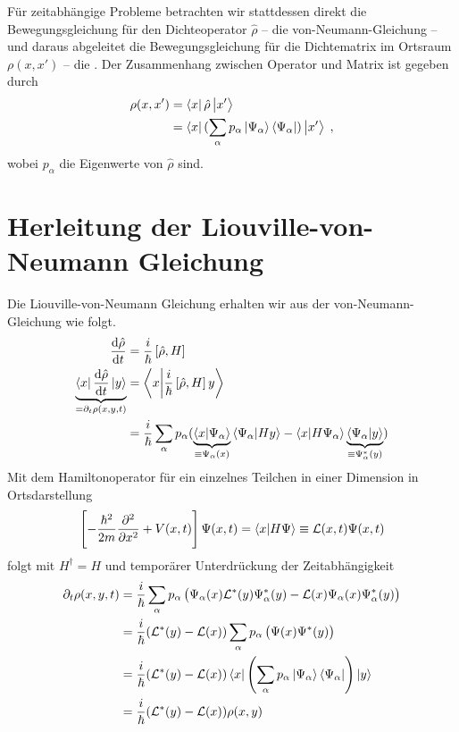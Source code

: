 Für zeitabhängige Probleme betrachten wir stattdessen direkt die Bewegungsgleichung für den Dichteoperator $\hat{\rho}$ -- die von-Neumann-Gleichung -- und daraus abgeleitet die Bewegungsgleichung für die Dichtematrix im Ortsraum $\rho(x,x')$ -- die \lvn. Der Zusammenhang zwischen Operator und Matrix ist gegeben durch
\begin{align}
  \rho(x,x') &= \bra{x} \hat{\rho} \ket{x'} \\
  &= \bra{x} (\sum_{\alpha} p_{\alpha} \ket{\Psi_{\alpha}}\bra{\Psi_{\alpha}}) \ket{x'} \; ,
\end{align}
wobei $p_{\alpha}$ die Eigenwerte von $\hat{\rho}$ sind.

\section{Herleitung der Liouville-von-Neumann Gleichung}
Die Liouville-von-Neumann Gleichung erhalten wir aus der von-Neumann-Gleichung wie folgt.
\begin{align}
  \frac{\mathrm{d}\hat{\rho}}{\mathrm{d}t} &= \frac{i}{\hbar}\left[\hat{\rho} , H\right] \\
  \underbrace{\bra{x} \frac{\mathrm{d}\hat{\rho}}{\mathrm{d}t} \ket{y}}_{= \partial_t \rho(x,y,t)} &= \bra{x}\ket{\frac{i}{\hbar}\left[\hat{\rho} , H\right]y} \\
   &= \frac{i}{\hbar} \sum_{\alpha} p_{\alpha} ( \underbrace{\bra{x}\ket{\Psi_{\alpha}}}_{\equiv \Psi_{\alpha}(x)}\bra{\Psi_{\alpha}}\ket{Hy} - \bra{x}\ket{H\Psi_{\alpha}}\underbrace{\bra{\Psi_{\alpha}}\ket{y}}_{\equiv \Psi_{\alpha}^*(y)} )
\end{align}
Mit dem Hamiltonoperator für ein einzelnes Teilchen in einer Dimension in Ortsdarstellung
\begin{align}
  \left[ -\frac{\hbar^2}{2m}\frac{\partial^2}{\partial x^2} + V(x,t) \right] \Psi(x,t) = \bra{x}\ket{H\Psi} \equiv \mathcal{L}(x,t)\Psi(x,t)
  \label{eq:Liouville-Operator}
\end{align}
folgt mit $H^{\dagger} = H$ und temporärer Unterdrückung der Zeitabhängigkeit
\begin{align}
  \partial_t \rho(x,y,t) &= \frac{i}{\hbar} \sum_{\alpha} p_{\alpha} \left( \Psi_{\alpha}(x)\mathcal{L}^*(y)\Psi_{\alpha}^*(y) - \mathcal{L}(x)\Psi_{\alpha}(x)\Psi_{\alpha}^*(y) \right) \\
  &= \frac{i}{\hbar}  (\mathcal{L}^*(y) - \mathcal{L}(x)) \sum_{\alpha} p_{\alpha} \left( \Psi(x)\Psi^*(y) \right) \\
  &= \frac{i}{\hbar}  (\mathcal{L}^*(y) - \mathcal{L}(x)) \bra{x}\left(\sum_{\alpha} p_{\alpha}  \ket{\Psi_{\alpha}}\bra{\Psi_{\alpha}} \right)\ket{y} \\
  &= \frac{i}{\hbar}  (\mathcal{L}^*(y) - \mathcal{L}(x))\rho(x,y)
\end{align}

